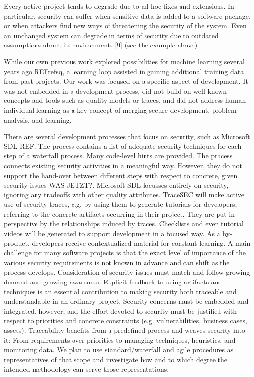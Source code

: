 Every active project tends to degrade due to ad-hoc fixes and extensions. In particular, security can suffer when sensitive data is added to a software package, or when attackers find new ways of threatening the security of the system. Even an unchanged system can degrade in terms of security due to outdated assumptions about its environments [9] (see the example above). 

While our own previous work explored possibilities for machine learning several years ago REFrefsq, a learning loop assisted in gaining additional training data from past projects. Our work was focused on a specific aspect of development. It was not embedded in a development process, did not build on well-known concepts and tools such as quality models or traces, and did not address human individual learning as a key concept of merging secure development, problem analysis, and learning. 

There are several development processes that focus on security, such as Microsoft SDL REF. The process contains a list of adequate security techniques for each step of a waterfall process. Many code-level hints are provided. The process connects existing security activities in a meaningful way. However, they do not support the hand-over between different steps with respect to concrete, given security issues  WAS JETZT?. Microsoft SDL focusses entirely on security, ignoring any tradeoffs with other quality attributes. TraceSEC will make active use of security traces, e.g. by using them to generate tutorials for developers, referring to the concrete artifacts occurring in their project. They are put in perspective by the relationships induced by traces. Checklists and even tutorial videos will be generated to support development in a focused way. As a by-product, developers receive contextualized material for constant learning. A main challenge for many software projects is that the exact level of importance of the various security requirements is not known in advance and can shift as the process develops. Consideration of security issues must match and follow growing demand and growing awareness. Explicit feedback to using artifacts and techniques is an essential contribution to making security both traceable and understandable in an ordinary project. Security concerns must be embedded and integrated, however, and the effort devoted to security must be justified with respect to priorities and concrete constraints (e.g. vulnerabilities, business cases, assets). Traceability benefits from a predefined process and weaves security into it: From requirements over priorities to managing techniques, heuristics, and monitoring data.  We plan to use standard/waterfall and agile procedures as representatives of that scope and investigate how and to which degree the intended methodology can serve those representations.



